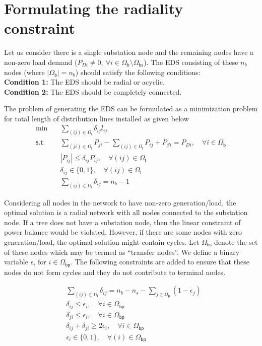 \section{Formulating the radiality constraint}
Let us consider there is a single substation node and the remaining nodes have a non-zero load demand ($P_{Di}\neq 0,\ \forall i\in\mathsf{\Omega_{b}}\setminus\mathsf{\Omega_{bs}}$). The EDS consisting of these $n_b$ nodes (where $|\mathsf{\Omega_{b}}|=n_b$) should satisfy the following conditions:\\
\textbf{Condition 1:} The EDS should be radial or acyclic.\\
\textbf{Condition 2:} The EDS should be completely connected.

The problem of generating the EDS can be formulated as a minimization problem for total length of distribution lines installed as given below
\begin{equation}
\begin{aligned}
\min\quad&\sum_{(ij)\in\mathsf{\Omega_{l}}}\delta_{ij}l_{ij}\\
\mathsf{s.t.}\quad&\sum_{(ji)\in\mathsf{\Omega_{l}}}P_{ji}-\sum_{(ij)\in\mathsf{\Omega_{l}}}P_{ij}+P_{Si}=P_{Di},\quad\forall i\in\mathsf{\Omega_{b}}\\
&|P_{ij}|\leq\delta_{ij}P_{ij},\quad\forall (ij)\in\mathsf{\Omega_{l}}\\
&\delta_{ij}\in\{0,1\},\quad\forall (ij)\in\mathsf{\Omega_{l}}\\
&\sum_{(ij)\in\mathsf{\Omega_{l}}}\delta_{ij}=n_b-1
\end{aligned}
\label{eq:radial-1}
\end{equation}

Considering all nodes in the network to have non-zero generation/load, the optimal solution is a radial network with all nodes connected to the substation node. If a tree does not have a substation node, then the linear constraint of power balance would be violated. However, if there are some nodes with zero generation/load, the optimal solution might contain cycles. Let $\mathsf{\Omega_{bs}}$ denote the set of these nodes which may be termed as ``transfer nodes''. We define a binary variable $\epsilon_{i}$ for $i\in\mathsf{\Omega_{bp}}$. The following constraints are added to ensure that these nodes do not form cycles and they do not contribute to terminal nodes.

\begin{equation}
\begin{aligned}
&\sum_{(ij)\in\mathsf{\Omega_{l}}}\delta_{ij}=n_b-n_s-\sum_{j\in\mathsf{\Omega_{p}}}(1-\epsilon_{j})\\
&\delta_{ij}\leq \epsilon_{i},\quad\forall i\in\mathsf{\Omega_{bp}}\\
&\delta_{ji}\leq \epsilon_{i},\quad\forall i\in\mathsf{\Omega_{bp}}\\
&\delta_{ij}+\delta_{ji}\geq 2\epsilon_{i},\quad\forall i\in\mathsf{\Omega_{bp}}\\
&\epsilon_{i}\in\{0,1\},\quad\forall (i)\in\mathsf{\Omega_{bp}}
\end{aligned}
\end{equation}